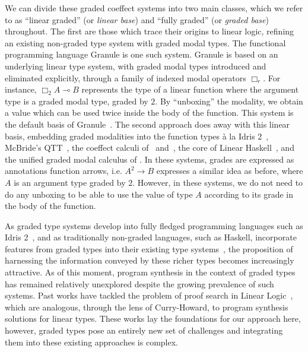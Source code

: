 We can divide these graded coeffect systems into two main classes, which we
refer to as ``linear graded'' (or \emph{linear base}) and ``fully graded'' (or
\emph{graded base}) throughout. The first are those which trace their origins to
linear logic, refining an existing non-graded type system with graded modal
types. The functional programming language Granule is one such system. Granule
is based on an underlying linear type system, with graded modal types introduced
and eliminated explicitly, through a family of indexed modal operators $\Box_r$.
For instance, $\Box_2 A \multimap B$ represents the type of a linear function
where the argument type is a graded modal type, graded by $2$. By ``unboxing''
the modality, we obtain a value which can be used twice inside the body of the
function. This system is the default basis of
Granule~\citep{DBLP:journals/pacmpl/OrchardLE19}. The second approach does away
with this linear basis, embedding graded modalities into the function types à la
Idris 2~\citep{DBLP:journals/corr/abs-2104-00480}, McBride's
QTT~\citep{McBride2016,quantitative-type-theory}, the coeffect calculi
of~\citet{DBLP:conf/icalp/PetricekOM13} and~\citet{petricek2014coeffects}, the
core of Linear Haskell~\citep{DBLP:journals/pacmpl/BernardyBNJS18}, and the
unified graded modal calculus of \citep{DBLP:journals/pacmpl/AbelB20}. In these
systems, grades are expressed as annotations function arrows, i.e. $A^2
\rightarrow B$ expresses a similar idea as before, where $A$ is an argument type
graded by $2$. However, in these systems, we do not need to do any unboxing to
be able to use the value of type $A$ according to its grade in the body of the
function.

As graded type systems develop into fully fledged programming languages such as
Idris 2~\citep{DBLP:journals/corr/abs-2104-00480}, and as traditionally
non-graded languages, such as Haskell, incorporate features from graded types
into their existing type systems~\citep{DBLP:journals/pacmpl/BernardyBNJS18},
the proposition of harnessing the information conveyed by these richer types
becomes increasingly attractive. As of this moment, program synthesis in the
context of graded types has remained relatively unexplored despite the growing
prevalence of such systems. Past works have tackled the problem of proof search
in Linear Logic~\citep{HODAS1994327, CERVESATO2000133}, which are analogous,
through the lens of Curry-Howard, to program synthesis solutions for linear
types. These works lay the foundations for our approach here, however, graded
types pose an entirely new set of challenges and integrating them into these
existing approaches is complex.

